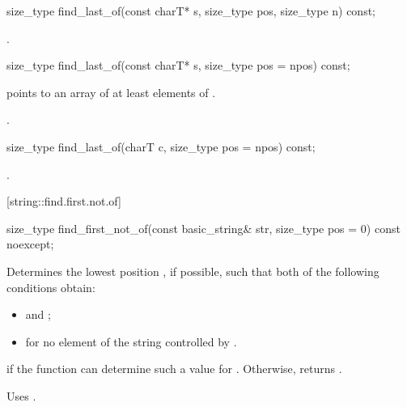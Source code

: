 %
%
\begin{itemdecl}
size_type find_last_of(const charT* s, size_type pos, size_type n) const;
\end{itemdecl}

\begin{itemdescr}
\pnum
\returns
{}.
\end{itemdescr}

%
%
\begin{itemdecl}
size_type find_last_of(const charT* s, size_type pos = npos) const;
\end{itemdecl}

\begin{itemdescr}
\pnum
\requires {} points to an array of at least 
elements of .

\pnum
\returns
{}.
\end{itemdescr}

%
%
\begin{itemdecl}
size_type find_last_of(charT c, size_type pos = npos) const;
\end{itemdecl}

\begin{itemdescr}
\pnum
\returns
{}.
\end{itemdescr}

[string::find.first.not.of]{}

%
%
\begin{itemdecl}
size_type
  find_first_not_of(const basic_string& str,
                    size_type pos = 0) const noexcept;
\end{itemdecl}

\begin{itemdescr}
\pnum
\effects
Determines the lowest position , if possible, such that both of
the following conditions obtain:

\begin{itemize}
\item
{}
and
;
\item
{}%
for no element  of the string controlled by .
\end{itemize}

\pnum
\returns
{} if the function can determine such a value for .
Otherwise, returns
.

\pnum
\notes
Uses
.
\end{itemdescr}

